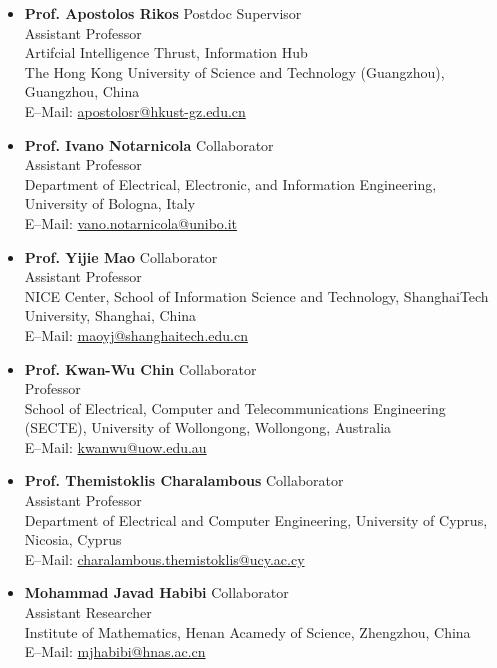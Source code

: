 \documentclass[paper=a4,fontsize=11pt]{scrartcl} %
\begin{document}
\begin{itemize}
	\item \textbf{Prof. Apostolos Rikos} {\hfill Postdoc Supervisor}\\
Assistant Professor\\ Artifcial Intelligence Thrust, Information Hub\\
The Hong Kong University of Science and Technology (Guangzhou), Guangzhou, China\\
E--Mail: \url{apostolosr@hkust-gz.edu.cn}

	\item \textbf{Prof. Ivano Notarnicola} {\hfill Collaborator}\\
Assistant Professor\\ 
Department of Electrical, Electronic, and Information Engineering,\\
University of Bologna, Italy\\
E--Mail: \url{vano.notarnicola@unibo.it}

	\item \textbf{Prof. Yijie Mao} {\hfill Collaborator}\\
Assistant Professor\\ NICE Center, School of Information Science and
Technology, ShanghaiTech University, Shanghai, China\\
E--Mail: \url{maoyj@shanghaitech.edu.cn}

	\item \textbf{Prof. Kwan-Wu Chin} {\hfill Collaborator}\\
Professor\\  School of Electrical, Computer and Telecommunications Engineering (SECTE), University of Wollongong, Wollongong, Australia \\
E--Mail: \url{kwanwu@uow.edu.au}

	\item \textbf{Prof. Themistoklis Charalambous} {\hfill Collaborator}\\
Assistant Professor\\ Department of Electrical and Computer Engineering, University of Cyprus, Nicosia, Cyprus \\
E--Mail: \url{charalambous.themistoklis@ucy.ac.cy}

	\item \textbf{Mohammad Javad Habibi} {\hfill Collaborator}\\
Assistant Researcher \\Institute of Mathematics, Henan Acamedy of Science, Zhengzhou, China \\
E--Mail: \url{mjhabibi@hnas.ac.cn}


\end{itemize}
\end{document}
